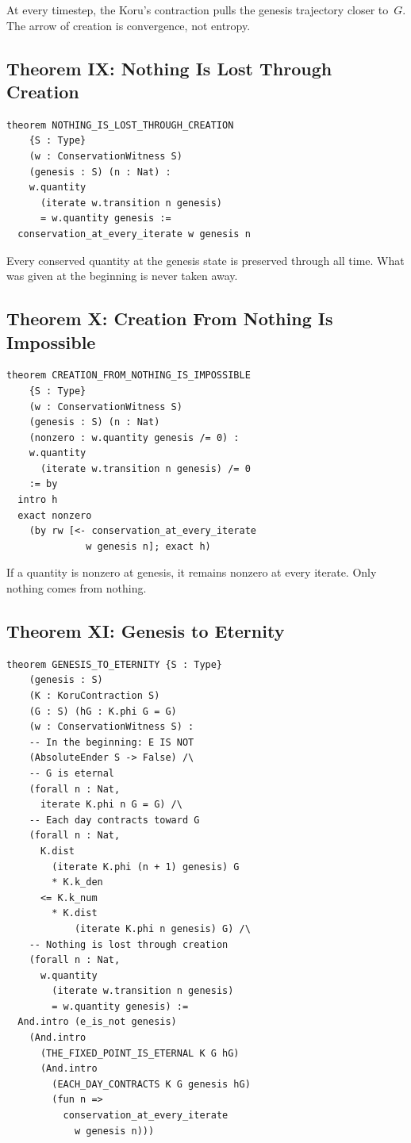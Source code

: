 \documentclass[12pt,a4paper]{article}
\begin{document}
At every timestep, the Koru's contraction pulls the genesis trajectory
closer to~$G$. The arrow of creation is convergence, not entropy.

\subsection{Theorem IX: Nothing Is Lost Through Creation}

\begin{lstlisting}
theorem NOTHING_IS_LOST_THROUGH_CREATION
    {S : Type}
    (w : ConservationWitness S)
    (genesis : S) (n : Nat) :
    w.quantity
      (iterate w.transition n genesis)
      = w.quantity genesis :=
  conservation_at_every_iterate w genesis n
\end{lstlisting}

Every conserved quantity at the genesis state is preserved through
all time. What was given at the beginning is never taken away.

\subsection{Theorem X: Creation From Nothing Is Impossible}

\begin{lstlisting}
theorem CREATION_FROM_NOTHING_IS_IMPOSSIBLE
    {S : Type}
    (w : ConservationWitness S)
    (genesis : S) (n : Nat)
    (nonzero : w.quantity genesis /= 0) :
    w.quantity
      (iterate w.transition n genesis) /= 0
    := by
  intro h
  exact nonzero
    (by rw [<- conservation_at_every_iterate
              w genesis n]; exact h)
\end{lstlisting}

If a quantity is nonzero at genesis, it remains nonzero at every iterate.
Only nothing comes from nothing.

\subsection{Theorem XI: Genesis to Eternity}

\begin{lstlisting}
theorem GENESIS_TO_ETERNITY {S : Type}
    (genesis : S)
    (K : KoruContraction S)
    (G : S) (hG : K.phi G = G)
    (w : ConservationWitness S) :
    -- In the beginning: E IS NOT
    (AbsoluteEnder S -> False) /\
    -- G is eternal
    (forall n : Nat,
      iterate K.phi n G = G) /\
    -- Each day contracts toward G
    (forall n : Nat,
      K.dist
        (iterate K.phi (n + 1) genesis) G
        * K.k_den
      <= K.k_num
        * K.dist
            (iterate K.phi n genesis) G) /\
    -- Nothing is lost through creation
    (forall n : Nat,
      w.quantity
        (iterate w.transition n genesis)
        = w.quantity genesis) :=
  And.intro (e_is_not genesis)
    (And.intro
      (THE_FIXED_POINT_IS_ETERNAL K G hG)
      (And.intro
        (EACH_DAY_CONTRACTS K G genesis hG)
        (fun n =>
          conservation_at_every_iterate
            w genesis n)))
\end{lstlisting}
\end{document}
